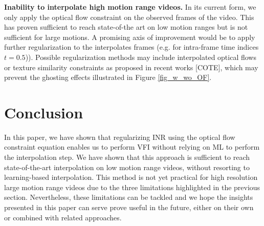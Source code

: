 \documentclass{article}
\begin{document}
\textbf{Inability to interpolate high motion range videos.}
In its current form, we only apply the optical flow constraint on the observed frames of the video.
This has proven sufficient to reach state-of-the art on low motion ranges but is not sufficient for large motions.
A promising axis of improvement would be to apply further regularization to the interpolates frames (e.g. for intra-frame time indices $t=0.5$)).
Possible regularization methods may include interpolated optical flows or texture similarity constraints as proposed in recent works [COTE],
which may prevent the ghosting effects illustrated in Figure \ref{fig_w_wo_OF}.


\section{Conclusion}

In this paper, we have shown that regularizing INR using the optical flow constraint equation
enables us to perform VFI without relying on ML to perform the interpolation step.
We have shown that this approach is sufficient to reach state-of-the-art interpolation on low motion range videos,
without resorting to learning-based interpolation.
This method is not yet practical for high resolution large motion range videos due to the three limitations highlighted in the previous section.
Nevertheless, these limitations can be tackled and we hope the insights presented in this paper can serve prove useful in the future,
either on their own or combined with related approaches.

  
  
\end{document}
